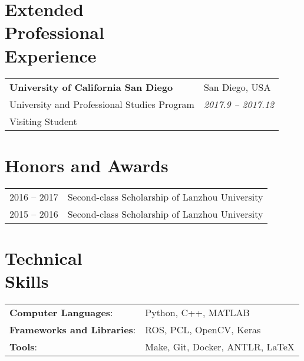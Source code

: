 \documentclass[margin,line,pifont,palatino,courier]{res}
\begin{document}
\begin{resume}
		\section{\sc Extended\\Professional\\Experience}
		
		\vspace{.05in}
		\begin{tabular}{@{}p{3.4in}p{2.0in}}
			{\bf University of California San Diego} & {\sc San Diego, USA} \\
			University and Professional Studies Program & {\sl 2017.9 -- 2017.12} \\
			Visiting Student
		\end{tabular}


		\section{\sc Honors and Awards}
		
		\begin{tabular}{@{}p{0.8in}p{4in}}
			2016 -- 2017 & Second-class Scholarship of Lanzhou University \\
			2015 -- 2016 & Second-class Scholarship of Lanzhou University \\
		\end{tabular}
		
		\section{\sc Technical\\Skills}
		
		\begin{tabular}{@{}p{2.2in}p{3in}}
			{\bf Computer Languages}: & Python, C++, MATLAB  \\
			{\bf Frameworks and Libraries}: & ROS, PCL, OpenCV, Keras\\
			{\bf Tools}: & Make, Git, Docker, ANTLR, \LaTeX
		\end{tabular}
		

\end{resume}
\end{document}
